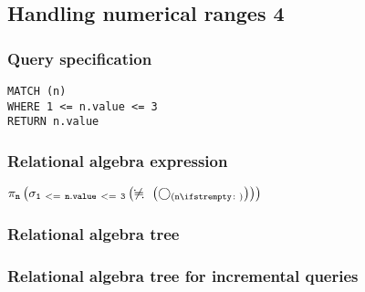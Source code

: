 \subsection{Handling numerical ranges 4}

\subsubsection*{Query specification}

\begin{lstlisting}
MATCH (n)
WHERE 1 <= n.value <= 3
RETURN n.value
\end{lstlisting}

\subsubsection*{Relational algebra expression}

$\projection{\var{n}} \left(\selection{\mathtt{1~<=~n.value~<=~3}} \left(\alldifferent{} \left(\getvertices{n}{}\right)\right)\right)$

\subsubsection*{Relational algebra tree}


\subsubsection*{Relational algebra tree for incremental queries}


